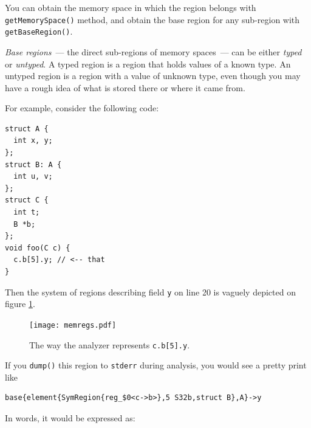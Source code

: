\documentclass[a4paper,12pt]{article}
\newenvironment{nobr}{\begin{minipage}{\textwidth}\setlength\parskip{1em}
}{\end{minipage}\ignorespacesafterend}
\begin{document}
You can obtain the memory space in which the region belongs with \lstinline|getMemorySpace()| method, and obtain the base region for any sub-region with \lstinline|getBaseRegion()|.

\emph{Base regions}~--- the direct sub-regions of memory spaces~--- can be either \emph{typed} or \emph{untyped}. A typed region is a region that holds values of a known type. An untyped region is a region with a value of unknown type, even though you may have a rough idea of what is stored there or where it came from.

\begin{nobr}
For example, consider the following code:
\begin{lstlisting}[style=cplusplus]
struct A {
  int x, y;
};
struct B: A {
  int u, v;
};
struct C {
  int t;
  B *b;
};
void foo(C c) {
  c.b[5].y; // <-- that
}
\end{lstlisting}
\end{nobr}

Then the system of regions describing field \lstinline|y| on line 20 is vaguely depicted on figure \ref{fig:memregs}.

\begin{figure}[!ht]\center
\texttt{[image: memregs.pdf]}
\caption{The way the analyzer represents \lstinline|c.b[5].y|.}
\label{fig:memregs}
\end{figure}

\begin{nobr}
If you \lstinline|dump()| this region to \lstinline|stderr| during analysis, you would see a pretty print like
\begin{lstlisting}[style=commandline]
base{element{SymRegion{reg_$0<c->b>},5 S32b,struct B},A}->y
\end{lstlisting}
\end{nobr}

In words, it would be expressed as:
\end{document}
